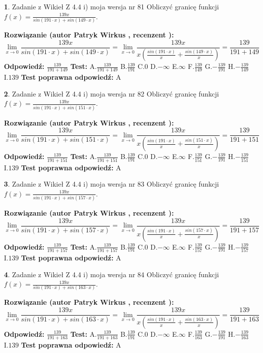 \documentclass[12pt, a4paper]{article}
\theoremstyle{definition} %
\newtheorem{zad}{}
\newcommand{\zadStart}[1]{\begin{zad}#1\newline}
\newcommand{\zadStop}{\end{zad}}
\newcommand{\rozwStart}[2]{\noindent \textbf{Rozwiązanie (autor #1 , recenzent #2): }\newline}
\newcommand{\rozwStop}{\newline}
\newcommand{\odpStart}{\noindent \textbf{Odpowiedź:}\newline}
\newcommand{\odpStop}{\newline}
\newcommand{\testStart}{\noindent \textbf{Test:}\newline}
\newcommand{\testStop}{\newline}
\newcommand{\kluczStart}{\noindent \textbf{Test poprawna odpowiedź:}\newline}
\newcommand{\kluczStop}{\newline}
\begin{document}
\zadStart{Zadanie z Wikieł Z 4.4 i) moja wersja nr 81}
Obliczyć granicę funkcji $f(x)=\frac{139x}{sin(191\cdot x) +sin(149\cdot x)}$.
\zadStop
\rozwStart{Patryk Wirkus}{}
$$\lim\limits_{x\to 0}\frac{139x}{sin(191\cdot x) +sin(149\cdot x)}=\lim\limits_{x\to 0}\frac{139x}{x(\frac{sin(191\cdot x)}{x}+\frac{sin(149\cdot x)}{x})}=\frac{139}{191+149}$$
\rozwStop
\odpStart
$\frac{139}{191+149}$
\odpStop
\testStart
A.$\frac{139}{191+149}$
B.$\frac{139}{191}$
C.$0$
D.$-\infty$
E.$\infty$
F.$\frac{139}{149}$
G.$-\frac{139}{191}$
H.$-\frac{139}{149}$
I.$139$
\testStop
\kluczStart
A
\kluczStop



\zadStart{Zadanie z Wikieł Z 4.4 i) moja wersja nr 82}
Obliczyć granicę funkcji $f(x)=\frac{139x}{sin(191\cdot x) +sin(151\cdot x)}$.
\zadStop
\rozwStart{Patryk Wirkus}{}
$$\lim\limits_{x\to 0}\frac{139x}{sin(191\cdot x) +sin(151\cdot x)}=\lim\limits_{x\to 0}\frac{139x}{x(\frac{sin(191\cdot x)}{x}+\frac{sin(151\cdot x)}{x})}=\frac{139}{191+151}$$
\rozwStop
\odpStart
$\frac{139}{191+151}$
\odpStop
\testStart
A.$\frac{139}{191+151}$
B.$\frac{139}{191}$
C.$0$
D.$-\infty$
E.$\infty$
F.$\frac{139}{151}$
G.$-\frac{139}{191}$
H.$-\frac{139}{151}$
I.$139$
\testStop
\kluczStart
A
\kluczStop



\zadStart{Zadanie z Wikieł Z 4.4 i) moja wersja nr 83}
Obliczyć granicę funkcji $f(x)=\frac{139x}{sin(191\cdot x) +sin(157\cdot x)}$.
\zadStop
\rozwStart{Patryk Wirkus}{}
$$\lim\limits_{x\to 0}\frac{139x}{sin(191\cdot x) +sin(157\cdot x)}=\lim\limits_{x\to 0}\frac{139x}{x(\frac{sin(191\cdot x)}{x}+\frac{sin(157\cdot x)}{x})}=\frac{139}{191+157}$$
\rozwStop
\odpStart
$\frac{139}{191+157}$
\odpStop
\testStart
A.$\frac{139}{191+157}$
B.$\frac{139}{191}$
C.$0$
D.$-\infty$
E.$\infty$
F.$\frac{139}{157}$
G.$-\frac{139}{191}$
H.$-\frac{139}{157}$
I.$139$
\testStop
\kluczStart
A
\kluczStop



\zadStart{Zadanie z Wikieł Z 4.4 i) moja wersja nr 84}
Obliczyć granicę funkcji $f(x)=\frac{139x}{sin(191\cdot x) +sin(163\cdot x)}$.
\zadStop
\rozwStart{Patryk Wirkus}{}
$$\lim\limits_{x\to 0}\frac{139x}{sin(191\cdot x) +sin(163\cdot x)}=\lim\limits_{x\to 0}\frac{139x}{x(\frac{sin(191\cdot x)}{x}+\frac{sin(163\cdot x)}{x})}=\frac{139}{191+163}$$
\rozwStop
\odpStart
$\frac{139}{191+163}$
\odpStop
\testStart
A.$\frac{139}{191+163}$
B.$\frac{139}{191}$
C.$0$
D.$-\infty$
E.$\infty$
F.$\frac{139}{163}$
G.$-\frac{139}{191}$
H.$-\frac{139}{163}$
I.$139$
\testStop
\kluczStart
A
\kluczStop
\end{document}
